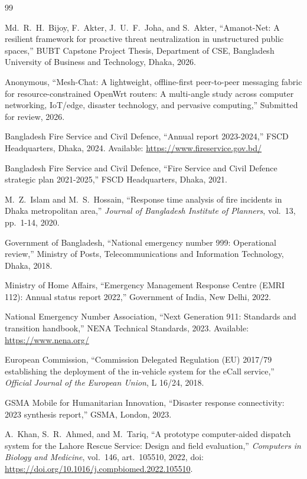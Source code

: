 
\begin{thebibliography}{99}

Md.\ R.~H.~Bijoy, F.~Akter, J.~U.~F.~Joha, and S.~Akter, ``Amanot-Net: A resilient framework for proactive threat neutralization in unstructured public spaces,''
BUBT Capstone Project Thesis, Department of CSE, Bangladesh University of Business and Technology, Dhaka, 2026.

Anonymous, ``Mesh-Chat: A lightweight, offline-first peer-to-peer messaging fabric for resource-constrained OpenWrt routers: A multi-angle study across computer networking, IoT/edge, disaster technology, and pervasive computing,''
Submitted for review, 2026.

Bangladesh Fire Service and Civil Defence, ``Annual report 2023-2024,''
FSCD Headquarters, Dhaka, 2024.
Available: \url{https://www.fireservice.gov.bd/}

Bangladesh Fire Service and Civil Defence, ``Fire Service and Civil Defence strategic plan 2021-2025,''
FSCD Headquarters, Dhaka, 2021.

M.~Z.~Islam and M.~S.~Hossain, ``Response time analysis of fire incidents in Dhaka metropolitan area,''
\textit{Journal of Bangladesh Institute of Planners}, vol.~13, pp.~1-14, 2020.

Government of Bangladesh, ``National emergency number 999: Operational review,''
Ministry of Posts, Telecommunications and Information Technology, Dhaka, 2018.

Ministry of Home Affairs, ``Emergency Management Response Centre (EMRI 112): Annual status report 2022,''
Government of India, New Delhi, 2022.

National Emergency Number Association, ``Next Generation 911: Standards and transition handbook,''
NENA Technical Standards, 2023.
Available: \url{https://www.nena.org/}

European Commission, ``Commission Delegated Regulation (EU) 2017/79 establishing the deployment of the in-vehicle system for the eCall service,''
\textit{Official Journal of the European Union}, L 16/24, 2018.

GSMA Mobile for Humanitarian Innovation, ``Disaster response connectivity: 2023 synthesis report,''
GSMA, London, 2023.

A.~Khan, S.~R.~Ahmed, and M.~Tariq, ``A prototype computer-aided dispatch system for the Lahore Rescue Service: Design and field evaluation,''
\textit{Computers in Biology and Medicine}, vol.~146, art.~105510, 2022,
doi: \url{https://doi.org/10.1016/j.compbiomed.2022.105510}.


\end{thebibliography}
